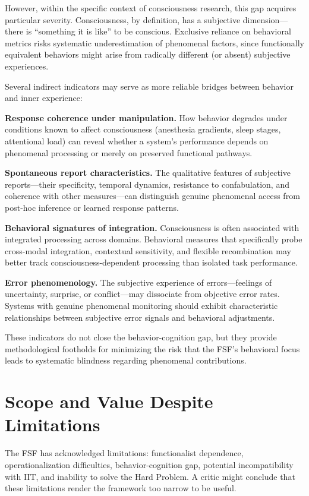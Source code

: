 \documentclass[12pt,a4paper]{article}
\begin{document}
However, within the specific context of consciousness research, this gap acquires particular severity. Consciousness, by definition, has a subjective dimension---there is ``something it is like'' to be conscious. Exclusive reliance on behavioral metrics risks systematic underestimation of phenomenal factors, since functionally equivalent behaviors might arise from radically different (or absent) subjective experiences.

Several indirect indicators may serve as more reliable bridges between behavior and inner experience:

\textbf{Response coherence under manipulation.} How behavior degrades under conditions known to affect consciousness (anesthesia gradients, sleep stages, attentional load) can reveal whether a system's performance depends on phenomenal processing or merely on preserved functional pathways.

\textbf{Spontaneous report characteristics.} The qualitative features of subjective reports---their specificity, temporal dynamics, resistance to confabulation, and coherence with other measures---can distinguish genuine phenomenal access from post-hoc inference or learned response patterns.

\textbf{Behavioral signatures of integration.} Consciousness is often associated with integrated processing across domains. Behavioral measures that specifically probe cross-modal integration, contextual sensitivity, and flexible recombination may better track consciousness-dependent processing than isolated task performance.

\textbf{Error phenomenology.} The subjective experience of errors---feelings of uncertainty, surprise, or conflict---may dissociate from objective error rates. Systems with genuine phenomenal monitoring should exhibit characteristic relationships between subjective error signals and behavioral adjustments.

These indicators do not close the behavior-cognition gap, but they provide methodological footholds for minimizing the risk that the FSF's behavioral focus leads to systematic blindness regarding phenomenal contributions.

\section{Scope and Value Despite Limitations}

The FSF has acknowledged limitations: functionalist dependence, operationalization difficulties, behavior-cognition gap, potential incompatibility with IIT, and inability to solve the Hard Problem. A critic might conclude that these limitations render the framework too narrow to be useful.
\end{document}
